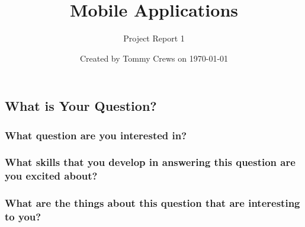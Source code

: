\documentclass[letterpaper]{article}            %
\title{Mobile Applications}                     %
\author{Project Report 1}                       %
\date{Created by Tommy Crews on \today}         %
\begin{document}
\newcommand{\code}[1]{\texttt{#1}}              %

\setcounter{section}{1}							%

\maketitle                                      %


%
%




\subsection{What is Your Question?}

\subsubsection{What question are you interested in?}



\subsubsection{What skills that you develop in answering this question are you excited about?}



\subsubsection{What are the things about this question that are interesting to you?}
\end{document}
